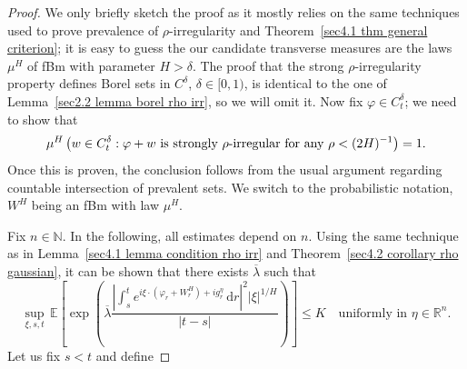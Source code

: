 \documentclass[10pt]{article}
\newcommand{\mathd}{\mathrm{d}}
\begin{document}
\begin{proof}
  We only briefly sketch the proof as it mostly relies on the same techniques
  used to prove prevalence of $\rho$-irregularity and Theorem~\ref{sec4.1 thm
  general criterion}; it is easy to guess the our candidate transverse
  measures are the laws $\mu^H$ of fBm with parameter $H > \delta$. The proof
  that the strong $\rho$\mbox{-}irregularity property defines Borel sets in
  $C^{\delta}$, $\delta \in [0, 1)$, is identical to the one of
  Lemma~\ref{sec2.2 lemma borel rho irr}, so we will omit it. Now fix $\varphi
  \in C^{\delta}_t$; we need to show that
  \[ \mu^H \left( w \in C^{\delta}_t : \varphi + w \text{ is strongly
     $\rho$\mbox{-}irregular for any } \rho < (2 H)^{- 1} \right) = 1. \]
  Once this is proven, the conclusion follows from the usual argument
  regarding countable intersection of prevalent sets. We switch to the
  probabilistic notation, $W^H$ being an fBm with law $\mu^H$.
  
  Fix $n \in \mathbb{N}$. In the following, all estimates depend on $n$.
  Using the same technique as in Lemma~\ref{sec4.1 lemma condition rho irr}
  and Theorem~\ref{sec4.2 corollary rho gaussian}, it can be shown that there
  exists $\overline{\lambda}$ such that
  \[ \sup_{\xi, s, t} \, \mathbb{E} \left[ \exp \left( \overline{\lambda} 
     \frac{\left| \int_s^t e^{i \xi \cdot (\varphi_r + W^H_r) + i g^{\eta}_r}
     \, \mathd r \right|^2 | \xi |^{1 / H}}{| t - s |} \right) \right]
     \leqslant K \quad \text{uniformly in $\eta \in \mathbb{R}^n$.} \]
  Let us fix $s < t$ and define
  

\end{proof}
\end{document}
